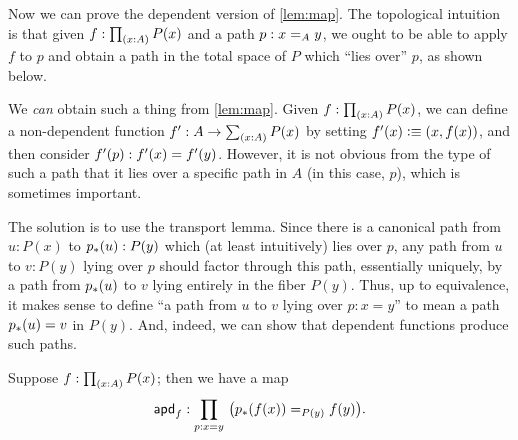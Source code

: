 Now we can prove the dependent version of \autoref{lem:map}.
The topological intuition is that given $f:\prd{x:A} P(x)$ and a path $p:\id[A]xy$, we ought to be able to apply $f$ to $p$ and obtain a path in the total space of $P$ which ``lies over'' $p$, as shown below.

\begin{center}
\end{center}

We \emph{can} obtain such a thing from \autoref{lem:map}.
Given $f:\prd{x:A} P(x)$, we can define a non-dependent function $f':A\to \sm{x:A} P(x)$ by setting $f'(x)\defeq (x,f(x))$, and then consider $\ap{f'}{p} : f'(x) = f'(y)$.
However, it is not obvious from the type of such a path that it lies over a specific path in $A$ (in this case, $p$), which is sometimes important.

The solution is to use the transport lemma.
Since there is a canonical path from $u:P(x)$ to $\trans p u :P(y)$ which (at least intuitively) lies over $p$, any path from $u$ to $v:P(y)$ lying over $p$ should factor through this path, essentially uniquely, by a path from $\trans p u$ to $v$ lying entirely in the fiber $P(y)$.
Thus, up to equivalence, it makes sense to define ``a path from $u$ to $v$ lying over $p:x=y$'' to mean a path $\trans p u = v$ in $P(y)$.
And, indeed, we can show that dependent functions produce such paths.

\begin{lem}\label{lem:mapdep}
  Suppose $f:\prd{x: A} P(x)$; then we have a map
  \[\apdfunc f : \prd{p:x=y}\big(\id[P(y)]{\trans p{f(x)}}{f(y)}\big).\]
\end{lem}

